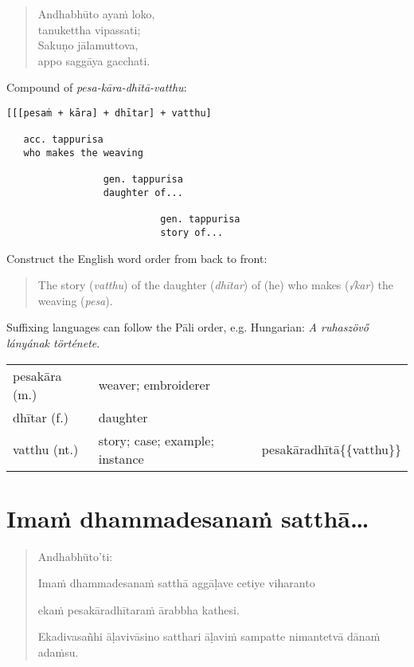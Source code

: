 \documentclass[11pt,oneside]{memoir}
\begin{document}
\begin{quote}
Andhabhūto ayaṁ loko,\\[0pt]
tanukettha vipassati;\\[0pt]
Sakuṇo jālamuttova,\\[0pt]
appo saggāya gacchati.
\end{quote}

Compound of \emph{pesa-kāra-dhītā-vatthu}:

\begin{verbatim}
[[[pesaṁ + kāra] + dhītar] + vatthu]

   acc. tappurisa
   who makes the weaving

                 gen. tappurisa
                 daughter of...

                           gen. tappurisa
                           story of...
\end{verbatim}


Construct the English word order from back to front:

\begin{quote}
The story (\emph{vatthu}) of the daughter (\emph{dhītar}) of (he) who makes (\emph{√kar}) the weaving (\emph{pesa}).
\end{quote}

Suffixing languages can follow the Pāli order, e.g. Hungarian: \emph{A ruhaszövő lányának története}.

\begin{longtable}{L{\colOne} L{\colTwo} H}
pesakāra (m.) & weaver; embroiderer & \\[0pt]
dhītar (f.) & daughter & \\[0pt]
vatthu (nt.) & story; case; example; instance & pesakāradhītā\{\{vatthu\}\}\\[0pt]
\end{longtable}

\clearpage

\section{Imaṁ dhammadesanaṁ satthā\ldots{}}
\label{sec:orgd98d69a}

\casesLegendHeaderBG

\begin{quote}
Andhabhūto'ti:

Imaṁ dhammadesanaṁ satthā aggāḷave cetiye viharanto

ekaṁ pesakāradhītaraṁ ārabbha kathesi.

Ekadivasañhi āḷavivāsino satthari āḷaviṁ sampatte nimantetvā dānaṁ adaṁsu.
\end{quote}
\end{document}
